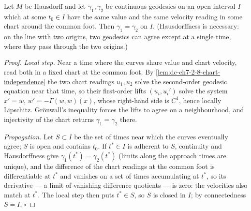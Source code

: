 \begin{lemma}
  \label{lem:dc-ch7-2-8-uniqueness}
  \leanok
  Let $M$ be Hausdorff and let $\gamma_1,\gamma_2$ be continuous geodesics on an
  open interval $I$ which at some $t_0\in I$ have the same value and the same
  velocity reading in some chart around the common foot. Then
  $\gamma_1=\gamma_2$ on $I$. (Hausdorffness is necessary: on the line with two
  origins, two geodesics can agree except at a single time, where they pass
  through the two origins.)
\end{lemma}
\begin{proof}
  \leanok
  \emph{Local step.} Near a time where the curves share value and chart velocity,
  read both in a fixed chart at the common foot. By
  \cref{lem:dc-ch7-2-8-chart-independence} the two chart readings $u_1,u_2$
  solve the second-order geodesic equation near that time, so their first-order
  lifts $(u_i,u_i')$ solve the system $x'=w$, $w'=-\Gamma(w,w)(x)$, whose
  right-hand side is $C^1$, hence locally Lipschitz. Grönwall's inequality forces
  the lifts to agree on a neighbourhood, and injectivity of the chart returns
  $\gamma_1=\gamma_2$ there.

  \emph{Propagation.} Let $S\subset I$ be the set of times near which the curves
  eventually agree; $S$ is open and contains $t_0$. If $t^*\in I$ is adherent to
  $S$, continuity and Hausdorffness give $\gamma_1(t^*)=\gamma_2(t^*)$ (limits
  along the approach times are unique), and the difference of the chart readings
  at the common foot is differentiable at $t^*$ and vanishes on a set of times
  accumulating at $t^*$, so its derivative — a limit of vanishing difference
  quotients — is zero: the velocities also match at $t^*$. The local step then
  puts $t^*\in S$, so $S$ is closed in $I$; by connectedness $S=I$. $\square$
\end{proof}

